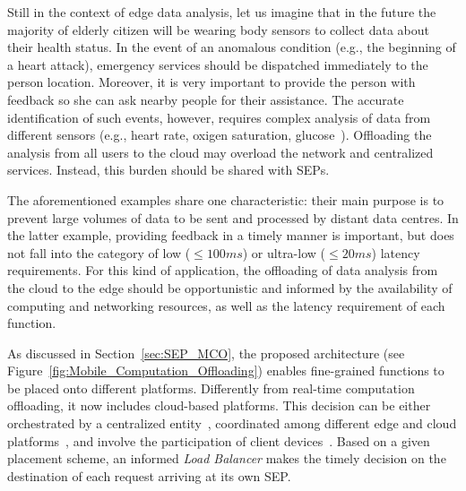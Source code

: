 Still in the context of edge data analysis, 
let us imagine that in the future the majority of elderly citizen will be wearing body sensors to collect data about their health status. In the event of an anomalous condition (e.g., the beginning of a heart attack), emergency services should be dispatched immediately to the person location. Moreover, it is very important to provide the person with feedback so she can ask nearby people for their assistance.
The accurate identification of such events, however, requires complex analysis of data from different sensors (e.g., heart rate, oxigen saturation, glucose~\cite{Li:2017}). Offloading the analysis from all users to the cloud may overload the network and centralized services. Instead, this burden should be shared with SEPs.%

The aforementioned examples share one characteristic: their main purpose is to prevent large volumes of data to be sent and processed by distant data centres. In the latter example, providing feedback in a timely manner is important, but does not fall into the category of low ($\leq 100ms$) or ultra-low ($\leq 20ms$) latency requirements. For this kind of application, the offloading of data analysis from the cloud to the edge should be opportunistic and informed by the availability of computing and networking resources, as well as the latency requirement of each function.

As discussed in Section~\ref{sec:SEP_MCO}, the proposed architecture (see Figure~\ref{fig:Mobile_Computation_Offloading}) enables fine-grained functions to be placed onto different platforms. Differently from real-time computation offloading, it now includes cloud-based platforms. This decision can be either orchestrated by a centralized entity~\cite{Taleb:2013}, coordinated among different edge and cloud platforms~\cite{Mach:2017}, and involve the participation of client devices~\cite{Baresi:2018}. Based on a given placement scheme, an informed \textit{Load Balancer} makes the timely decision on the destination of each request arriving at its own SEP.


